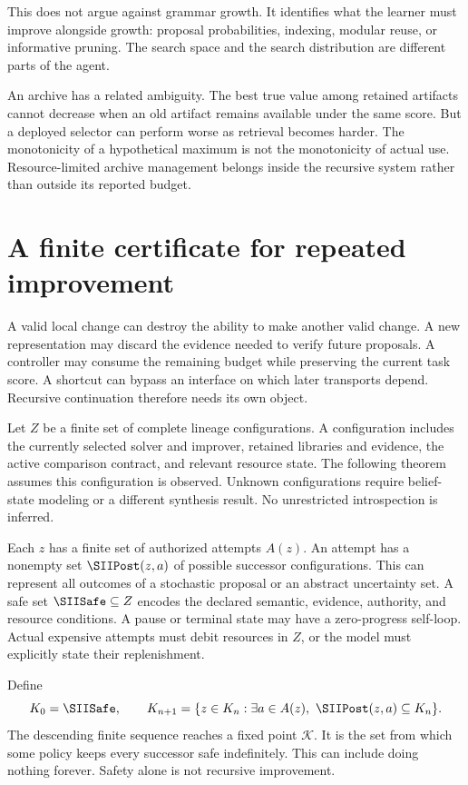 This does not argue against grammar growth. It identifies what the learner must improve alongside growth: proposal probabilities, indexing, modular reuse, or informative pruning. The search space and the search distribution are different parts of the agent.

An archive has a related ambiguity. The best true value among retained artifacts cannot decrease when an old artifact remains available under the same score. But a deployed selector can perform worse as retrieval becomes harder. The monotonicity of a hypothetical maximum is not the monotonicity of actual use. Resource-limited archive management belongs inside the recursive system rather than outside its reported budget.

\section{A finite certificate for repeated improvement}\label{SII:sec:recursion}
A valid local change can destroy the ability to make another valid change. A new representation may discard the evidence needed to verify future proposals. A controller may consume the remaining budget while preserving the current task score. A shortcut can bypass an interface on which later transports depend. Recursive continuation therefore needs its own object.

Let $Z$ be a finite set of complete lineage configurations. A configuration includes the currently selected solver and improver, retained libraries and evidence, the active comparison contract, and relevant resource state. The following theorem assumes this configuration is observed. Unknown configurations require belief-state modeling or a different synthesis result. No unrestricted introspection is inferred.

Each $z$ has a finite set of authorized attempts $A(z)$. An attempt has a nonempty set $\SIIPost(z,a)$ of possible successor configurations. This can represent all outcomes of a stochastic proposal or an abstract uncertainty set. A safe set $\SIISafe\subseteq Z$ encodes the declared semantic, evidence, authority, and resource conditions. A pause or terminal state may have a zero-progress self-loop. Actual expensive attempts must debit resources in $Z$, or the model must explicitly state their replenishment.

Define
\[
K_0=\SIISafe,\qquad
K_{n+1}=\{z\in K_n:\exists a\in A(z),\ \SIIPost(z,a)\subseteq K_n\}.
\]
The descending finite sequence reaches a fixed point $\mathcal K$. It is the set from which some policy keeps every successor safe indefinitely. This can include doing nothing forever. Safety alone is not recursive improvement.

